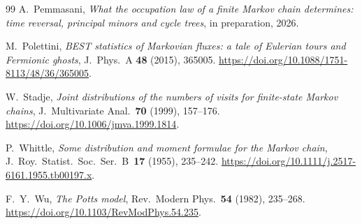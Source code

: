 \begin{thebibliography}{99}
A.~Pemmasani, \emph{What the occupation law of a finite Markov chain
determines: time reversal, principal minors and cycle trees}, in
preparation, 2026.

M.~Polettini, \emph{BEST statistics of Markovian fluxes: a tale of Eulerian
tours and Fermionic ghosts}, J.~Phys.~A \textbf{48} (2015), 365005.
\url{https://doi.org/10.1088/1751-8113/48/36/365005}.

W.~Stadje, \emph{Joint distributions of the numbers of visits for finite-state
Markov chains}, J.~Multivariate Anal.~\textbf{70} (1999), 157--176.
\url{https://doi.org/10.1006/jmva.1999.1814}.

P.~Whittle, \emph{Some distribution and moment formulae for the Markov
chain}, J.~Roy.~Statist.~Soc.~Ser.~B~\textbf{17} (1955), 235--242.
\url{https://doi.org/10.1111/j.2517-6161.1955.tb00197.x}.

F.~Y.~Wu, \emph{The Potts model}, Rev.~Modern Phys.~\textbf{54} (1982), 235--268.
\url{https://doi.org/10.1103/RevModPhys.54.235}.

\end{thebibliography}
